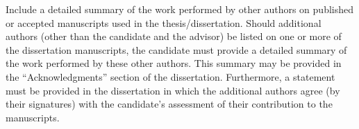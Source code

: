 Include a detailed summary of the work performed by other authors on published or accepted manuscripts used in the thesis/dissertation.
Should additional authors (other than the candidate and the advisor) be listed on
one or more of the dissertation manuscripts, the candidate must provide a
detailed summary of the work performed by these other authors.
This summary may be provided in the “Acknowledgments” section of the dissertation.
Furthermore, a statement must be provided in the dissertation in which the
additional authors agree (by their signatures) with the candidate’s assessment of
their contribution to the manuscripts.